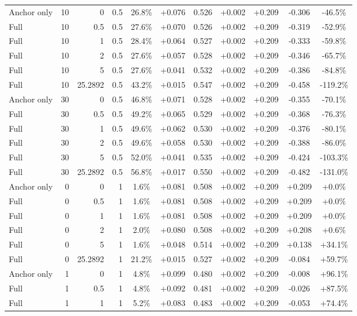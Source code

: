 \begin{table}[htbp]
\begin{tabular}{lrrrccccccc}
Anchor only & 10 & 0 & 0.5 & 26.8\% & +0.076 & 0.526 & +0.002 & +0.209 & -0.306 & -46.5\% \\
Full & 10 & 0.5 & 0.5 & 27.6\% & +0.070 & 0.526 & +0.002 & +0.209 & -0.319 & -52.9\% \\
Full & 10 & 1 & 0.5 & 28.4\% & +0.064 & 0.527 & +0.002 & +0.209 & -0.333 & -59.8\% \\
Full & 10 & 2 & 0.5 & 27.6\% & +0.057 & 0.528 & +0.002 & +0.209 & -0.346 & -65.7\% \\
Full & 10 & 5 & 0.5 & 27.6\% & +0.041 & 0.532 & +0.002 & +0.209 & -0.386 & -84.8\% \\
Full & 10 & 25.2892 & 0.5 & 43.2\% & +0.015 & 0.547 & +0.002 & +0.209 & -0.458 & -119.2\% \\
Anchor only & 30 & 0 & 0.5 & 46.8\% & +0.071 & 0.528 & +0.002 & +0.209 & -0.355 & -70.1\% \\
Full & 30 & 0.5 & 0.5 & 49.2\% & +0.065 & 0.529 & +0.002 & +0.209 & -0.368 & -76.3\% \\
Full & 30 & 1 & 0.5 & 49.6\% & +0.062 & 0.530 & +0.002 & +0.209 & -0.376 & -80.1\% \\
Full & 30 & 2 & 0.5 & 49.6\% & +0.058 & 0.530 & +0.002 & +0.209 & -0.388 & -86.0\% \\
Full & 30 & 5 & 0.5 & 52.0\% & +0.041 & 0.535 & +0.002 & +0.209 & -0.424 & -103.3\% \\
Full & 30 & 25.2892 & 0.5 & 56.8\% & +0.017 & 0.550 & +0.002 & +0.209 & -0.482 & -131.0\% \\
Anchor only & 0 & 0 & 1 & 1.6\% & +0.081 & 0.508 & +0.002 & +0.209 & +0.209 & +0.0\% \\
Full & 0 & 0.5 & 1 & 1.6\% & +0.081 & 0.508 & +0.002 & +0.209 & +0.209 & +0.0\% \\
Full & 0 & 1 & 1 & 1.6\% & +0.081 & 0.508 & +0.002 & +0.209 & +0.209 & +0.0\% \\
Full & 0 & 2 & 1 & 2.0\% & +0.080 & 0.508 & +0.002 & +0.209 & +0.208 & +0.6\% \\
Full & 0 & 5 & 1 & 1.6\% & +0.048 & 0.514 & +0.002 & +0.209 & +0.138 & +34.1\% \\
Full & 0 & 25.2892 & 1 & 21.2\% & +0.015 & 0.527 & +0.002 & +0.209 & -0.084 & +59.7\% \\
Anchor only & 1 & 0 & 1 & 4.8\% & +0.099 & 0.480 & +0.002 & +0.209 & -0.008 & +96.1\% \\
Full & 1 & 0.5 & 1 & 4.8\% & +0.092 & 0.481 & +0.002 & +0.209 & -0.026 & +87.5\% \\
Full & 1 & 1 & 1 & 5.2\% & +0.083 & 0.483 & +0.002 & +0.209 & -0.053 & +74.4\% \\

\end{tabular}
\end{table}

